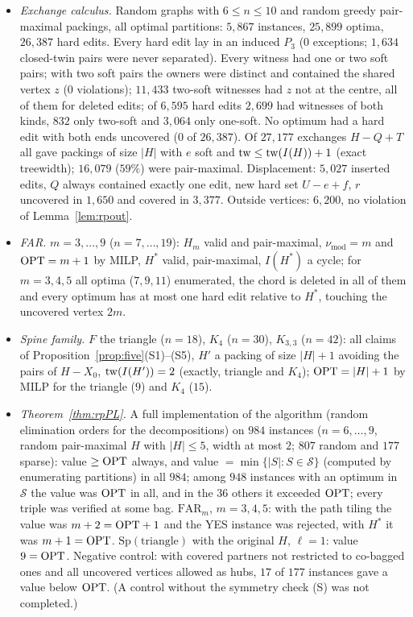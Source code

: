 \begin{itemize}
\item \emph{Exchange calculus.} Random graphs with $6\le n\le10$ and random greedy pair-maximal packings, all optimal partitions: $5{,}867$ instances, $25{,}899$ optima, $26{,}387$ hard edits. Every hard edit lay in an induced $P_3$ ($0$ exceptions; $1{,}634$ closed-twin pairs were never separated). Every witness had one or two soft pairs; with two soft pairs the owners were distinct and contained the shared vertex $z$ ($0$ violations); $11{,}433$ two-soft witnesses had $z$ not at the centre, all of them for deleted edits; of $6{,}595$ hard edits $2{,}699$ had witnesses of both kinds, $832$ only two-soft and $3{,}064$ only one-soft. No optimum had a hard edit with both ends uncovered ($0$ of $26{,}387$). Of $27{,}177$ exchanges $H-Q+T$ all gave packings of size $|H|$ with $e$ soft and $\mathrm{tw}\le\mathrm{tw}(I(H))+1$ (exact treewidth); $16{,}079$ ($59\%$) were pair-maximal. Displacement: $5{,}027$ inserted edits, $Q$ always contained exactly one edit, new hard set $U-e+f$, $r$ uncovered in $1{,}650$ and covered in $3{,}377$. Outside vertices: $6{,}200$, no violation of Lemma~\ref{lem:rpout}.
\item \emph{FAR.} $m=3,\dots,9$ ($n=7,\dots,19$): $H_m$ valid and pair-maximal, $\nu_{\mathrm{mod}}=m$ and $\mathrm{OPT}=m+1$ by MILP, $H^*$ valid, pair-maximal, $I(H^*)$ a cycle; for $m=3,4,5$ all optima ($7,9,11$) enumerated, the chord is deleted in all of them and every optimum has at most one hard edit relative to $H^*$, touching the uncovered vertex $2m$.
\item \emph{Spine family.} $F$ the triangle ($n=18$), $K_4$ ($n=30$), $K_{3,3}$ ($n=42$): all claims of Proposition~\ref{prop:five}(S1)--(S5), $H'$ a packing of size $|H|+1$ avoiding the pairs of $H-X_0$, $\mathrm{tw}(I(H'))=2$ (exactly, triangle and $K_4$); $\mathrm{OPT}=|H|+1$ by MILP for the triangle ($9$) and $K_4$ ($15$).
\item \emph{Theorem~\ref{thm:rpPL}.} A full implementation of the algorithm (random elimination orders for the decompositions) on $984$ instances ($n=6,\dots,9$, random pair-maximal $H$ with $|H|\le5$, width at most $2$; $807$ random and $177$ sparse): value $\ge\mathrm{OPT}$ always, and value $=\min\{|S|:S\in\mathcal S\}$ (computed by enumerating partitions) in all $984$; among $948$ instances with an optimum in $\mathcal S$ the value was $\mathrm{OPT}$ in all, and in the $36$ others it exceeded $\mathrm{OPT}$; every triple was verified at some bag. $\mathrm{FAR}_m$, $m=3,4,5$: with the path tiling the value was $m+2=\mathrm{OPT}+1$ and the YES instance was rejected, with $H^*$ it was $m+1=\mathrm{OPT}$. $\mathrm{Sp}(\text{triangle})$ with the original $H$, $\ell=1$: value $9=\mathrm{OPT}$. Negative control: with covered partners not restricted to co-bagged ones and all uncovered vertices allowed as hubs, $17$ of $177$ instances gave a value below $\mathrm{OPT}$. (A control without the symmetry check (S) was not completed.)

\end{itemize}
